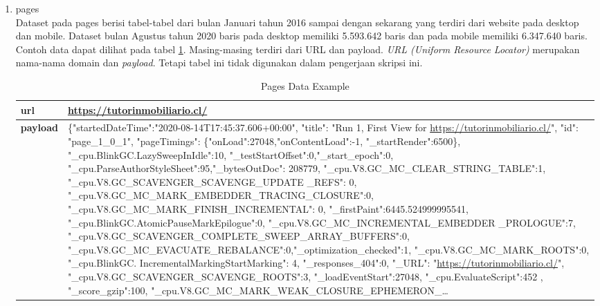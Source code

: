 \begin{enumerate}
\item pages\\
Dataset pada pages berisi tabel-tabel dari bulan Januari tahun 2016 sampai dengan sekarang yang terdiri dari website pada desktop dan mobile. Dataset bulan Agustus tahun 2020 baris pada desktop memiliki 5.593.642 baris dan pada mobile memiliki 6.347.640 baris. Contoh data dapat dilihat pada tabel \ref{table:pages_data_sample}.
Masing-masing terdiri dari URL dan payload. \textit{URL (Uniform Resource Locator)} merupakan nama-nama domain dan \textit{payload}. Tetapi tabel ini tidak digunakan dalam pengerjaan skripsi ini.

\begin{table}[H]
	\centering
	\begin{tabular*}{\textwidth}{|l|p{14.13cm}|}
		\hline
		\textbf{url} & \url{https://tutorinmobiliario.cl/}\\ 
		\hline
		\textbf{payload} & \{"startedDateTime":"2020-08-14T17:45:37.606+00:00", "title": "Run 1, First View for \url{https://tutorinmobiliario.cl/}", "id": "page\_1\_0\_1", "pageTimings": \{"onLoad":27048,"onContentLoad":-1, "\_startRender":6500\}, "\_cpu.BlinkGC.LazySweepInIdle":10, "\_testStartOffset":0,"\_start\_epoch":0, "\_cpu.ParseAuthorStyleSheet":95,"\_bytesOutDoc": 208779, "\_cpu.V8.GC\_MC\_CLEAR\_STRING\_TABLE":1, "\_cpu.V8.GC\_SCAVENGER\_SCAVENGE\_UPDATE \_REFS": 0, "\_cpu.V8.GC\_MC\_MARK\_EMBEDDER\_TRACING\_CLOSURE":0, "\_cpu.V8.GC\_MC\_MARK\_FINISH\_INCREMENTAL": 0, "\_firstPaint":6445.524999995541, "\_cpu.BlinkGC.AtomicPauseMarkEpilogue":0,  "\_cpu.V8.GC\_MC\_INCREMENTAL\_EMBEDDER \_PROLOGUE":7, "\_cpu.V8.GC\_SCAVENGER\_COMPLETE\_SWEEP\_ARRAY\_BUFFERS":0, "\_cpu.V8.GC\_MC\_EVACUATE\_REBALANCE":0,"\_optimization\_checked":1, "\_cpu.V8.GC\_MC\_MARK\_ROOTS":0, "\_cpu.BlinkGC. IncrementalMarkingStartMarking": 4, "\_responses\_404":0, "\_URL": "\url{https://tutorinmobiliario.cl/}", "\_cpu.V8.GC\_SCAVENGER\_SCAVENGE\_ROOTS":3, "\_loadEventStart":27048, "\_cpu.EvaluateScript":452 , "\_score\_gzip":100, "\_cpu.V8.GC\_MC\_MARK\_WEAK\_CLOSURE\_EPHEMERON\_…\\
		\hline
		
	\end{tabular*}
	\caption{Pages Data Example}
	\label{table:pages_data_sample}
\end{table}


\end{enumerate}
